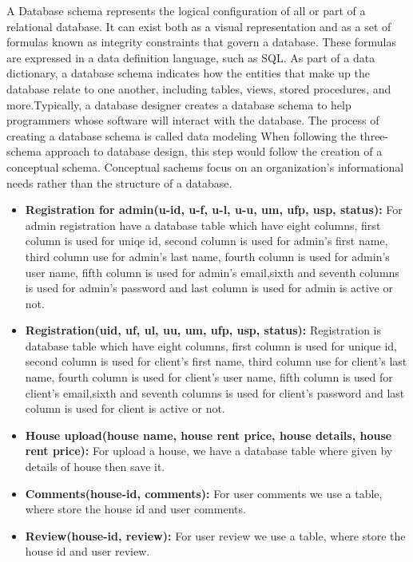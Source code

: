 \documentclass[12pt,a4paper]{report}
\newcommand\tab[1][0cm]{\hspace*{#1}}
\begin{document}
		\tab A Database schema \cite{Ref:22} represents the logical configuration of all or part of a relational database. It can exist both as a visual representation and as a set of formulas known as integrity constraints that govern a database. These formulas are expressed in a data definition language, such as SQL. As part of a data dictionary, a database schema indicates how the entities that make up the database relate to one another, including tables, views, stored procedures, and more.Typically, a database designer creates a database schema to help programmers whose software will interact with the database. The process of creating a database schema is called data modeling When following the three-schema approach to database design, this step would follow the creation of a conceptual schema. Conceptual sachems focus on an organization’s informational needs rather than the structure of a database.

		\begin{itemize}
			\item \textbf{Registration for admin(u-id, u-f, u-l, u-u, um, ufp, usp, status):} For admin registration have a database table which have eight columns, first column is used for uniqe id, second column is used for admin's first name, third column use for admin's last name, fourth column is used for admin's user name, fifth column is used for admin's email,sixth and seventh columns is used for admin's password and last column is used for admin is active or not. 
			\item \textbf{Registration(uid, uf, ul, uu, um, ufp, usp, status):} Registration is database table which have eight columns, first column is used for unique id, second column is used for client's first name, third column use for client's last name, fourth column is used for client's user name, fifth column is used for client's email,sixth and seventh columns is used for client's password and last column is used for client is active or not. 
			\item \textbf{House upload(house name, house rent price, house details, house rent price):} For upload a house, we have a database table where given by details of house then save it.
			\item \textbf{Comments(house-id, comments):} For user comments we use a table, where store the house id and user comments.
			\item \textbf{Review(house-id, review):} For user review we use a table, where store the house id and user review.
		\end{itemize}
	
\end{document}
